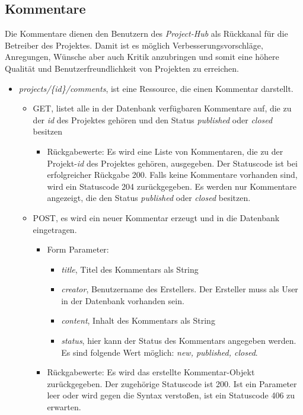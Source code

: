\documentclass[12pt]{scrartcl}
\begin{document}
\subsection{Kommentare}
	Die Kommentare dienen den Benutzern des \emph{Project-Hub} als Rückkanal für die Betreiber des Projektes. Damit ist es möglich Verbesserungsvorschläge, Anregungen, Wünsche aber auch Kritik anzubringen und somit eine höhere Qualität und Benutzerfreundlichkeit von Projekten zu erreichen.  
	\begin{itemize}
		\item \emph {projects/\{id\}/comments}, ist eine Ressource, die einen Kommentar darstellt.
		\begin{itemize}
			\item GET, listet alle in der Datenbank verfügbaren Kommentare auf, die zu der \emph{id} des Projektes gehören und  den Status \emph{published} oder \emph{closed} besitzen
			\begin{itemize}
				\item Rückgabewerte: Es wird eine Liste von Kommentaren, die zu der Projekt-\emph{id} des Projektes gehören, ausgegeben. Der Statuscode ist bei erfolgreicher Rückgabe 200. Falls keine Kommentare vorhanden sind, wird ein Statuscode 204 zurückgegeben. Es werden nur Kommentare angezeigt, die den Status \emph{published} oder \emph{closed} besitzen.
			\end{itemize}
					\item POST, es wird ein neuer Kommentar erzeugt und in die Datenbank eingetragen.
					\begin{itemize}
						\item Form Parameter:
						\begin{itemize}
							\item  \emph{title}, Titel des Kommentars als String
							\item  \emph{creator}, Benutzername des Erstellers. Der Ersteller muss als User in der Datenbank vorhanden sein.
							\item  \emph{content}, Inhalt des Kommentars als String
							\item  \emph{status}, hier kann der Status des Kommentars angegeben werden. Es sind folgende Wert möglich: \emph{new, published, closed}.
						\end{itemize}
						\item Rückgabewerte: Es wird das erstellte Kommentar-Objekt zurückgegeben. Der zugehörige Statuscode ist 200. Ist ein Parameter leer oder wird gegen die Syntax verstoßen, ist ein Statuscode 406 zu erwarten.  

\end{itemize}
\end{itemize}
\end{itemize}
\end{document}
